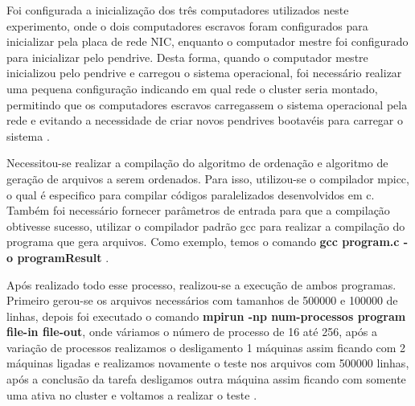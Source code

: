 \documentclass[12pt]{article}
\begin{document}
    Foi configurada a inicialização dos três computadores utilizados neste experimento, onde o dois computadores
    escravos foram configurados para inicializar pela placa de rede NIC, enquanto o computador mestre foi configurado
    para inicializar pelo pendrive. Desta forma, quando o computador mestre inicializou pelo pendrive e carregou o sistema
    operacional, foi necessário realizar uma pequena configuração indicando em qual rede o cluster seria montado, permitindo
    que os computadores escravos carregassem o sistema operacional pela rede e evitando a necessidade de criar novos pendrives
    bootavéis para carregar o sistema \cite{pel1:995}.

    Necessitou-se realizar a compilação do algoritmo de ordenação e algoritmo de geração de arquivos a serem ordenados. Para isso, utilizou-se o compilador mpicc, o qual é especifico para compilar códigos paralelizados desenvolvidos em c. Também foi necessário fornecer parâmetros de entrada para que a compilação obtivesse sucesso, utilizar o compilador padrão gcc para realizar a compilação do programa que gera arquivos. Como exemplo, temos o comando \textbf{gcc program.c -o programResult} \cite{pel2:996}.

    Após realizado todo esse processo, realizou-se a execução de ambos programas. Primeiro gerou-se os arquivos necessários com tamanhos de 500000 e 100000 de linhas, depois foi executado o comando \textbf{mpirun -np num-processos program file-in file-out}, onde váriamos o número de processo de 16 até 256, após a variação de processos realizamos o desligamento 1 máquinas assim ficando com 2 máquinas ligadas e realizamos novamente o teste nos arquivos com 500000 linhas, após a conclusão da tarefa desligamos outra máquina assim ficando com somente uma ativa no cluster e voltamos a realizar o teste \cite{pel13:997}.
    
\end{document}
